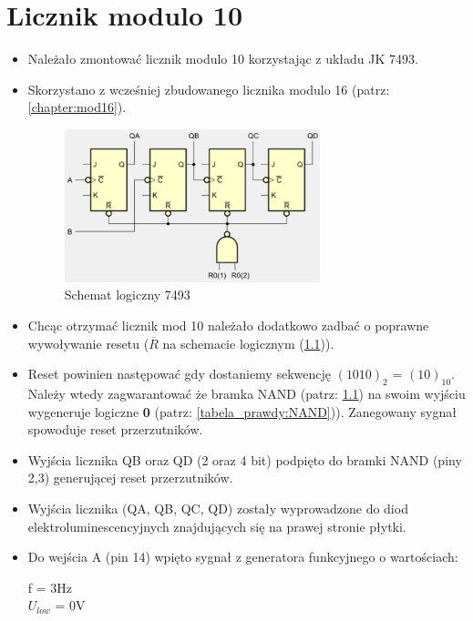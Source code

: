 \chapter{Licznik modulo 10}

\begin{itemize}
    \item Należało zmontować licznik modulo 10 korzystając z układu JK 7493.
    \item Skorzystano z wcześniej zbudowanego licznika modulo 16 (patrz: \autoref{chapter:mod16}).
        \begin{figure}[H]
            \centering
            \includegraphics[width=0.7\textwidth]{img/schemes/logic_scheme_7943.png}
            \caption{Schemat logiczny 7493}
            \label{licznik_mod10:schemat_logiczny}
        \end{figure}
    \item Chcąc otrzymać licznik mod 10 należało dodatkowo zadbać o poprawne wywoływanie resetu ($\overline{R}$ na schemacie logicznym (\ref{licznik_mod10:schemat_logiczny})).
    \item Reset powinien następować gdy dostaniemy sekwencję $(1010)_2$ = $(10)_{10}$. Należy wtedy zagwarantować że bramka NAND (patrz: \ref{licznik_mod10:schemat_logiczny}) na swoim wyjściu wygeneruje logiczne \textbf{0} (patrz: \ref{tabela_prawdy:NAND})). Zanegowany sygnał spowoduje reset przerzutników.
    \item Wyjścia licznika QB oraz QD (2 oraz 4 bit) podpięto do bramki NAND (piny 2,3) generującej reset przerzutników.
    \item Wyjścia licznika (QA, QB, QC, QD) zostały wyprowadzone do diod elektroluminescencyjnych     znajdujących się na prawej stronie płytki.
    \item Do wejścia A (pin 14) wpięto sygnał z generatora funkcyjnego o wartościach:
        \begin{center}
            f = 3Hz \\
            $U_{low}$ = 0V \\

\end{center}
\end{itemize}
